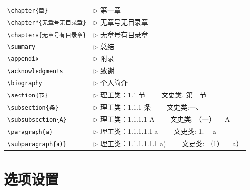 \begin{tabular}{ll}
  \verb|\chapter{章}|              & $\triangleright$ 第一章 \\
  \verb|\chapter*{无章号无目录章}|       & $\triangleright$ 无章号无目录章 \\
  \verb|\chaptera{无章号有目录章}|   & $\triangleright$ 无章号有目录章 \\
  \verb|\summary|                  & $\triangleright$ 总结\\
  \verb|\appendix|                 & $\triangleright$ 附录\\
  \verb|\acknowledgments|          & $\triangleright$ 致谢\\
  \verb|\biography|                & $\triangleright$ 个人简介\\
  \verb|\section{节}|              & $\triangleright$ 理工类：1.1 节 ~~~~文史类: 第一节 \\
  \verb|\subsection{条}|           & $\triangleright$ 理工类：1.1.1 条 ~~~~文史类:一、\\
  \verb|\subsubsection{A}|         & $\triangleright$ 理工类：1.1.1.1 A  ~~~~文史类: （一） ~~A\\
  \verb|\paragraph{a}|             & $\triangleright$ 理工类：1.1.1.1.1 a  ~~~~文史类: 1. ~~a\\
  \verb|\subparagraph{a)}|         & $\triangleright$ 理工类：1.1.1.1.1.1 a)  ~~~~文史类: （1） ~~a）\\
\end{tabular}

\section{选项设置}

